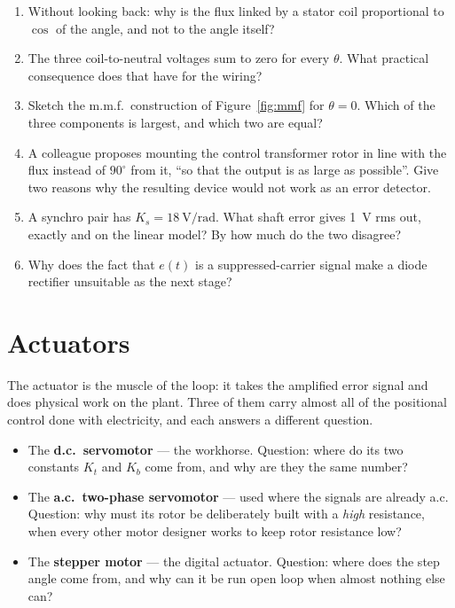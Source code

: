 \documentclass[11pt,a4paper]{article}
\begin{document}
\begin{enumerate}[leftmargin=2em,itemsep=2pt]
\item Without looking back: why is the flux linked by a stator coil
      proportional to $\cos$ of the angle, and not to the angle itself?
\item The three coil-to-neutral voltages sum to zero for every $\theta$. What
      practical consequence does that have for the wiring?
\item Sketch the m.m.f.\ construction of Figure~\ref{fig:mmf} for
      $\theta=0$. Which of the three components is largest, and which two are
      equal?
\item A colleague proposes mounting the control transformer rotor in line with
      the flux instead of $90^\circ$ from it, ``so that the output is as large
      as possible''. Give two reasons why the resulting device would not work
      as an error detector.
\item A synchro pair has $K_{s}=\SI{18}{\volt\per\radian}$. What shaft error
      gives \SI{1}{\volt} rms out, exactly and on the linear model? By how
      much do the two disagree?
\item Why does the fact that $e(t)$ is a suppressed-carrier signal make a
      diode rectifier unsuitable as the next stage?
\end{enumerate}

\section{Actuators}
\label{sec:actuators}

The actuator is the muscle of the loop: it takes the amplified error signal and
does physical work on the plant. Three of them carry almost all of the
positional control done with electricity, and each answers a different
question.

\begin{itemize}[leftmargin=1.5em,itemsep=1pt]
\item The \textbf{d.c.\ servomotor} --- the workhorse. Question: where do its
      two constants $K_{t}$ and $K_{b}$ come from, and why are they the same
      number?
\item The \textbf{a.c.\ two-phase servomotor} --- used where the signals are
      already a.c. Question: why must its rotor be deliberately built with a
      \emph{high} resistance, when every other motor designer works to keep
      rotor resistance low?
\item The \textbf{stepper motor} --- the digital actuator. Question: where does
      the step angle come from, and why can it be run open loop when almost
      nothing else can?
\end{itemize}
\end{document}
